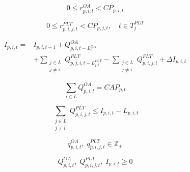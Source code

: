 \documentclass[12pt]{article}
\begin{document}
\begin{equation}
0 \le r^{OA}_{p,i,t} < CP_{p,i,t}
\end{equation}

\begin{equation}
0 \le r^{PLT}_{p,i,j,t} < CP_{p,j,t}, \quad t \in T_j^{PLT}
\end{equation}

\begin{align}
I_{p,i,t}
=& I_{p,i,t-1}
+ Q^{OA}_{p,i,t-L_i^{OA}} \\
&+ \sum_{\substack{j \in L \\ j \neq i}} Q^{PLT}_{p,j,i,t-L_{j,i}^{PLT}}
- \sum_{\substack{j \in L \\ j \neq i}} Q^{PLT}_{p,i,j,t}
+ \Delta I_{p,i,t}
\end{align}

\begin{equation}
\sum_{i \in L} Q^{OA}_{p,i,t} = CAP_{p,t}
\end{equation}

\begin{equation}
\sum_{\substack{j \in L \\ j \neq i}} Q^{PLT}_{p,i,j,t}
\le I_{p,i,t} - L_{p,i,t}
\end{equation}

\begin{equation}
q^{OA}_{p,i,t},\; q^{PLT}_{p,i,j,t} \in \mathbb{Z}_+
\end{equation}

\begin{equation}
Q^{OA}_{p,i,t},\; Q^{PLT}_{p,i,j,t},\; I_{p,i,t} \ge 0
\end{equation}
\end{document}
